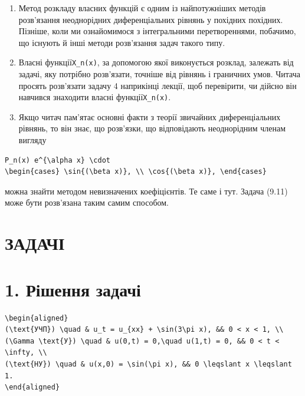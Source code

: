 \documentclass[
  ukrainian,
]{article}
\begin{document}
\begin{enumerate}
\def\labelenumi{\arabic{enumi}.}
\item
  Метод розкладу власних функцій є одним із найпотужніших методів
  розв'язання неоднорідних диференціальних рівнянь у похідних похідних.
  Пізніше, коли ми ознайомимося з інтегральними перетвореннями,
  побачимо, що існують й інші методи розв'язання задач такого типу.
\item
  Власні функції\texttt{X\_n(x)}, за допомогою якої виконується розклад,
  залежать від задачі, яку потрібно розв'язати, точніше від рівнянь і
  граничних умов. Читача просять розв'язати задачу 4 наприкінці лекції,
  щоб перевірити, чи дійсно він навчився знаходити власні
  функції\texttt{X\_n(x)}.
\item
  Якщо читач пам'ятає основні факти з теорії звичайних диференціальних
  рівнянь, то він знає, що розв'язки, що відповідають неоднорідним
  членам вигляду
\end{enumerate}

\begin{verbatim}
P_n(x) e^{\alpha x} \cdot
\begin{cases} \sin{(\beta x)}, \\ \cos{(\beta x)}, \end{cases}
\end{verbatim}

можна знайти методом невизначених коефіцієнтів. Те саме і тут. Задача
(9.11) може бути розв'язана таким самим способом.

\section{ЗАДАЧІ}\label{ux437ux430ux434ux430ux447ux456}

\section{1. Рішення
задачі}\label{ux440ux456ux448ux435ux43dux43dux44f-ux437ux430ux434ux430ux447ux456}

\begin{verbatim}
\begin{aligned}
(\text{УЧП}) \quad & u_t = u_{xx} + \sin(3\pi x), && 0 < x < 1, \\
(\Gamma \text{У}) \quad & u(0,t) = 0,\quad u(1,t) = 0, && 0 < t < \infty, \\
(\text{НУ}) \quad & u(x,0) = \sin(\pi x), && 0 \leqslant x \leqslant 1.
\end{aligned}
\end{verbatim}
\end{document}
